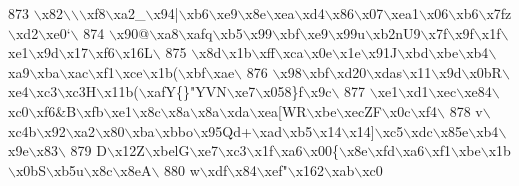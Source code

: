 \begin{DoxyCode}
{{{{{{{{{873 \textcolor{stringliteral}{\(\backslash\)x82\(\backslash\)\(\backslash\)\(\backslash\)xf8\(\backslash\)xa2\_\(\backslash\)x94|\(\backslash\)xb6\(\backslash\)xe9\(\backslash\)x8e\(\backslash\)xea\(\backslash\)xd4\(\backslash\)x86\(\backslash\)x07\(\backslash\)xea1\(\backslash\)x06\(\backslash\)xb6\(\backslash\)x7fz\(\backslash\)xd2\(\backslash\)xe0`\(\backslash\)}
874 \textcolor{stringliteral}{\(\backslash\)x90@\(\backslash\)xa8\(\backslash\)xafq\(\backslash\)xb5\(\backslash\)x99\(\backslash\)xbf\(\backslash\)xe9\(\backslash\)x99u\(\backslash\)xb2nU9\(\backslash\)x7f\(\backslash\)x9f\(\backslash\)x1f\(\backslash\)xe1\(\backslash\)x9d\(\backslash\)x17\(\backslash\)xf6\(\backslash\)x16L\(\backslash\)}
875 \textcolor{stringliteral}{\(\backslash\)x8d\(\backslash\)x1b\(\backslash\)xff\(\backslash\)xca\(\backslash\)x0e\(\backslash\)x1e\(\backslash\)x91J\(\backslash\)xbd\(\backslash\)xbe\(\backslash\)xb4\(\backslash\)xa9\(\backslash\)xba\(\backslash\)xac\(\backslash\)xf1\(\backslash\)xce\(\backslash\)x1b(\(\backslash\)xbf\(\backslash\)xae\(\backslash\)}
876 \textcolor{stringliteral}{\(\backslash\)x98\(\backslash\)xbf\(\backslash\)xd20\(\backslash\)xdas\(\backslash\)x11\(\backslash\)x9d\(\backslash\)x0bR\(\backslash\)xe4\(\backslash\)xc3\(\backslash\)xc3H\(\backslash\)x11b(\(\backslash\)xafY\{\}"YVN\(\backslash\)xe7\(\backslash\)x058\}f\(\backslash\)x9c\(\backslash\)}
877 \textcolor{stringliteral}{\(\backslash\)xe1\(\backslash\)xd1\(\backslash\)xec\(\backslash\)xe84\(\backslash\)xc0\(\backslash\)xf6&B\(\backslash\)xfb\(\backslash\)xe1\(\backslash\)x8c\(\backslash\)x8a\(\backslash\)x8a\(\backslash\)xda\(\backslash\)xea[WR\(\backslash\)xbe\(\backslash\)xecZF\(\backslash\)x0c\(\backslash\)xf4\(\backslash\)}
878 \textcolor{stringliteral}{v\(\backslash\)xc4b\(\backslash\)x92\(\backslash\)xa2\(\backslash\)x80\(\backslash\)xba\(\backslash\)xbbo\(\backslash\)x95Qd+\(\backslash\)xad\(\backslash\)xb5\(\backslash\)x14\(\backslash\)x14]\(\backslash\)xc5\(\backslash\)xdc\(\backslash\)x85e\(\backslash\)xb4\(\backslash\)x9e\(\backslash\)x83\(\backslash\)}
879 \textcolor{stringliteral}{D\(\backslash\)x12Z\(\backslash\)xbelG\(\backslash\)xe7\(\backslash\)xc3\(\backslash\)x1f\(\backslash\)xa6\(\backslash\)x00\{\(\backslash\)x8e\(\backslash\)xfd\(\backslash\)xa6\(\backslash\)xf1\(\backslash\)xbe\(\backslash\)x1b\(\backslash\)x0bS\(\backslash\)xb5u\(\backslash\)x8c\(\backslash\)x8eA\(\backslash\)}
880 \textcolor{stringliteral}{w\(\backslash\)xdf\(\backslash\)x84\(\backslash\)xef"\(\backslash\)x162\(\backslash\)xab\(\backslash\)xc0%
}}}}}}}}}}
\end{DoxyCode}
